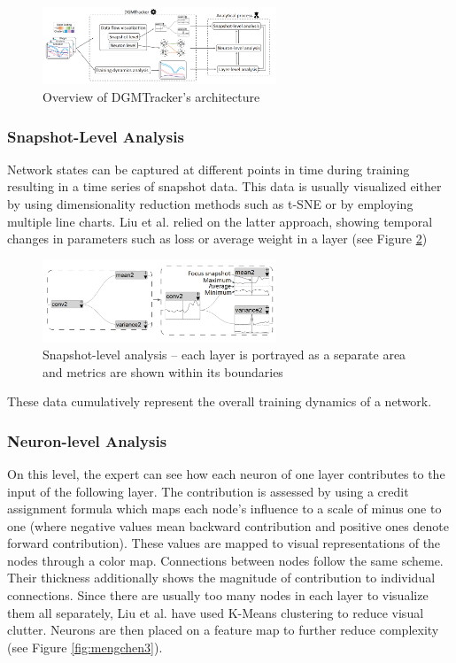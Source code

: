 \documentclass{acmsiggraph}               %
\begin{document}
\begin{figure}[!htb]
  \centering
  \includegraphics[width=2.75in]{mengchen1}
  \caption{Overview of DGMTracker's architecture \protect\cite{Liu2018}}
  \label{fig:mengchen1}
\end{figure}

\subsubsection{Snapshot-Level Analysis}
Network states can be captured at different points in time during training resulting in a time series of snapshot data.
This data is usually visualized either by using dimensionality reduction methods such as t-SNE or by employing multiple line charts. 
Liu et al. relied on the latter approach, showing temporal changes in parameters such as loss or average weight in a layer (see Figure \ref{fig:mengchen2})

\begin{figure}[!htb]
  \centering
  \includegraphics[width=2.75in]{mengchen2}
  \caption{Snapshot-level analysis -- each layer is portrayed as a separate area and metrics are shown within its boundaries \protect\cite{Liu2018}}
  \label{fig:mengchen2}
\end{figure}

These data cumulatively represent the overall training dynamics of a network.

\subsubsection{Neuron-level Analysis}
On this level, the expert can see how each neuron of one layer contributes to the input of the following layer. The contribution is assessed by using a credit assignment formula which maps each node's influence to a scale of minus one to one (where negative values mean backward contribution and positive ones denote forward contribution).
These values are mapped to visual representations of the nodes through a color map. Connections between nodes follow the same scheme. Their thickness additionally shows the magnitude of contribution to individual connections. Since there are usually too many nodes in each layer to visualize them all separately, Liu et al. have used K-Means clustering to reduce visual clutter. Neurons are then placed on a feature map to further reduce complexity (see Figure \ref{fig:mengchen3}).
\end{document}
